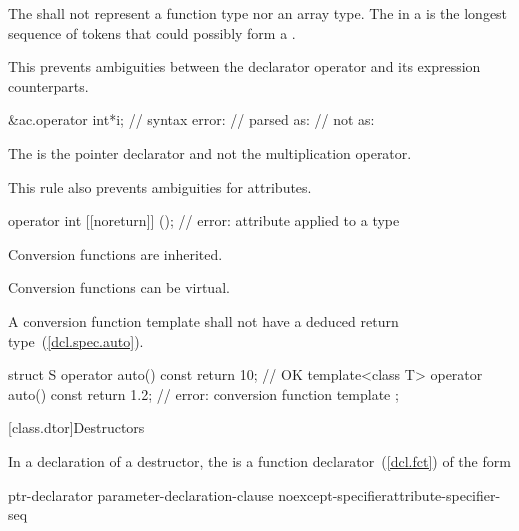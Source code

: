 \pnum
The
shall not represent a function type nor an array type.
The
in a
is the longest sequence of
tokens that could possibly form a .
\begin{note}
This prevents ambiguities between the declarator operator \tcode{*} and its expression
counterparts.
\begin{example}
\begin{codeblock}
&ac.operator int*i; // syntax error:
                    // parsed as: 
                    // not as: 
\end{codeblock}
The \tcode{*} is the pointer declarator and not the multiplication operator.
\end{example}
This rule also prevents ambiguities for attributes. 
\begin{example}
\begin{codeblock}
operator int [[noreturn]] ();   // error:  attribute applied to a type
\end{codeblock}
\end{example}
\end{note}

\pnum
{}%
Conversion functions are inherited.

\pnum
{}%
Conversion functions can be virtual.

\pnum
{}%
A conversion function template shall not have a
deduced return type~(\ref{dcl.spec.auto}).
\begin{example}
\begin{codeblock}
struct S {
  operator auto() const { return 10; }      // OK
  template<class T>
  operator auto() const { return 1.2; }     // error: conversion function template
};
\end{codeblock}
\end{example}

[class.dtor]{Destructors}%

\pnum
In a declaration of a destructor, the  is a
function declarator~(\ref{dcl.fct}) of the form

\begin{ncbnf}
ptr-declarator \terminal{(} parameter-declaration-clause \terminal{)} noexcept-specifier\opt attribute-specifier-seq\opt
\end{ncbnf}

